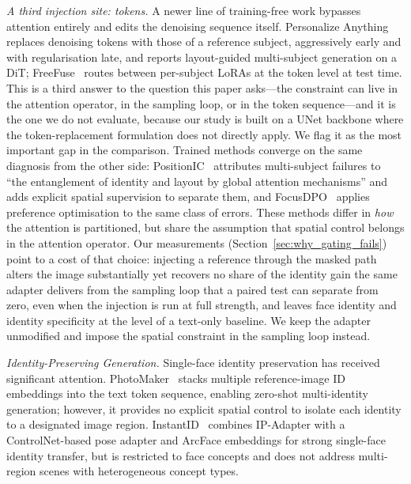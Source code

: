 \documentclass[10pt,twocolumn,letterpaper]{article}
\begin{document}
\noindent\textit{A third injection site: tokens.}
A newer line of training-free work bypasses attention entirely and edits
the denoising sequence itself.  Personalize
Anything~\cite{feng2026personalize} replaces denoising tokens with those
of a reference subject, aggressively early and with regularisation late,
and reports layout-guided multi-subject generation on a DiT;
FreeFuse~\cite{liu2025freefuse} routes between per-subject LoRAs at the
token level at test time.  This is a third answer to the question this
paper asks---the constraint can live in the attention operator, in the
sampling loop, or in the token sequence---and it is the one we do not
evaluate, because our study is built on a UNet backbone where the
token-replacement formulation does not directly apply.  We flag it as the
most important gap in the comparison.  Trained methods converge on the same
diagnosis from the other side:
PositionIC~\cite{hu2026positionic} attributes multi-subject failures to
``the entanglement of identity and layout by global attention
mechanisms'' and adds explicit spatial supervision to separate them, and
FocusDPO~\cite{jin2025focusdpo} applies preference optimisation to the
same class of errors.  These methods differ in \emph{how} the attention is
partitioned, but
share the assumption that spatial control belongs in the attention
operator.  Our measurements (Section~\ref{sec:why_gating_fails}) point to
a cost of that choice: injecting a reference through the masked path
alters the image substantially yet recovers no share of the identity gain
the same adapter delivers from the sampling loop that a paired test can
separate from zero, even when the injection is run at full strength, and
leaves face identity and identity specificity at the level of a text-only
baseline.  We keep the
adapter unmodified and impose the spatial constraint in the sampling loop
instead.

\noindent\textit{Identity-Preserving Generation.}
Single-face identity preservation has received significant attention.
PhotoMaker~\cite{li2024photomaker} stacks multiple reference-image ID
embeddings into the text token sequence, enabling zero-shot
multi-identity generation; however, it provides no explicit spatial
control to isolate each identity to a designated image region.
InstantID~\cite{wang2024instantid} combines IP-Adapter with a
ControlNet-based pose adapter and ArcFace embeddings for strong
single-face identity transfer, but is restricted to face concepts and
does not address multi-region scenes with heterogeneous concept types.
\end{document}
